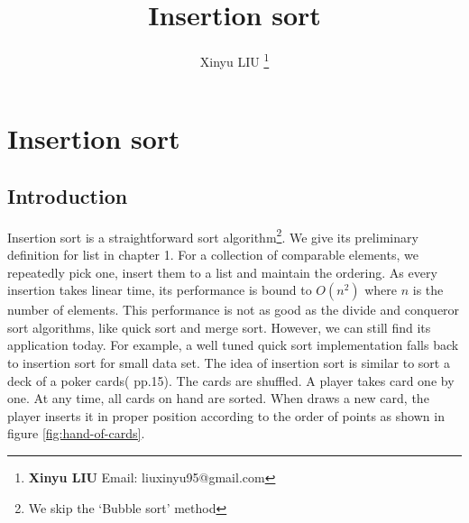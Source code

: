 \documentclass[b5paper]{article}
\begin{document}
\title{Insertion sort}

\author{Xinyu LIU
\thanks{{\bfseries Xinyu LIU} \newline
  Email: liuxinyu95@gmail.com \newline}
  }

\maketitle
\fi


\ifx\wholebook\relax
\chapter{Insertion sort}
\fi

\section{Introduction}
\label{sec:isort-introduction} 

Insertion sort is a straightforward sort algorithm\footnote{We skip the `Bubble sort' method}. We give its preliminary definition for list in chapter 1. For a collection of comparable elements, we repeatedly pick one, insert them to a list and maintain the ordering. As every insertion takes linear time, its performance is bound to $O(n^2)$ where $n$ is the number of elements. This performance is not as good as the divide and conqueror sort algorithms, like quick sort and merge sort. However, we can still find its application today. For example, a well tuned quick sort implementation falls back to insertion sort for small data set. The idea of insertion sort is similar to sort a deck of a poker cards(\cite{CLRS} pp.15). The cards are shuffled. A player takes card one by one. At any time, all cards on hand are sorted. When draws a new card, the player inserts it in proper position according to the order of points as shown in figure \ref{fig:hand-of-cards}.
\end{document}
